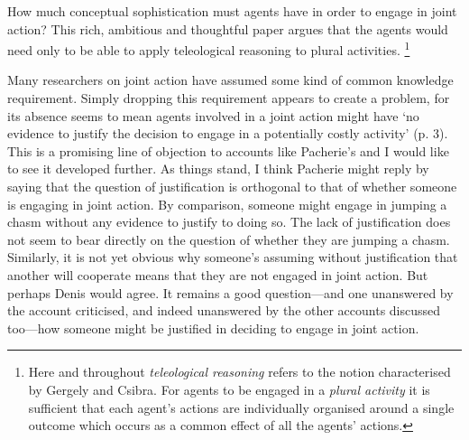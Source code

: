 \documentclass[12pt,a4paper]{extarticle}
\begin{document}
\setlength\footnotesep{1em}


\author{}
\date{}


\maketitle




How much conceptual sophistication must  agents have in order to engage in joint action?
This rich, ambitious and thoughtful paper argues that the agents would need only to be able to apply teleological reasoning to plural activities.%
\footnote{
Here and throughout \emph{teleological reasoning} refers to the notion characterised by Gergely and Csibra.
For agents to be engaged in a \emph{plural activity} it is sufficient that each agent’s actions are individually organised around a single outcome which occurs as a common effect of all the agents’ actions.
}


Many researchers on joint action have assumed some kind of common knowledge requirement.
Simply dropping this requirement appears to create a problem, for its absence seems to mean agents involved in a joint action might have ‘no evidence to justify the decision to engage in a potentially costly activity’ (p. 3).  
This is a promising line of objection to accounts like Pacherie’s and I would like to see it developed further.
As things stand, I think Pacherie might reply by saying that the question of justification is orthogonal to that of whether someone is engaging in joint action.
By comparison, someone might engage in jumping a chasm without any evidence to justify to doing so.
The lack of justification does not seem to bear directly on the question of whether they are jumping a chasm.
Similarly, it is not yet obvious why someone’s assuming without justification that another will cooperate means that they are not engaged in joint action.
But perhaps Denis would agree.
It remains a good question---and one unanswered by the account criticised, and indeed unanswered by the other accounts discussed too---how someone might be justified in deciding to engage in joint action.
\end{document}
